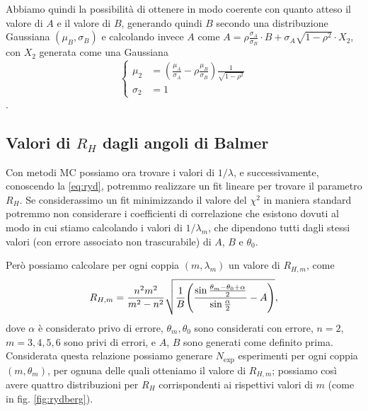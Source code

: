 \documentclass[a4paper,aps,12pt,tightenlines]{revtex4-2}
\begin{document}
Abbiamo quindi la possibilità di ottenere in modo coerente con quanto atteso il valore di $A$ e il valore di $B$, generando quindi $B$ secondo una distribuzione Gaussiana $(\mu_B, \sigma_B)$ e calcolando invece $A$ come $A=\rho \frac{\sigma_A}{\sigma_B}\cdot B + \sigma_A \sqrt{1-\rho^2} \cdot X_2$, con $X_2$ generata come una Gaussiana \begin{equation}\left\{\begin{aligned}\mu_2 &= \left(\frac{\mu_A}{\sigma_A} - \rho\frac{\mu_B}{\sigma_B}\right)\frac{1}{\sqrt{1-\rho^2}}\\\sigma_2 &= 1\end{aligned}\right.\end{equation}.

\subsection{Valori di $R_H$ dagli angoli di Balmer}\label{sec:R_H}

Con metodi MC possiamo ora trovare i valori di $1/\lambda$, e successivamente, conoscendo la \eqref{eq:ryd}, potremmo realizzare un fit lineare per trovare il parametro $R_H$. Se considerassimo un fit minimizzando il valore del $\chi^2$ in maniera standard potremmo non considerare i coefficienti di correlazione che esistono dovuti al modo in cui stiamo calcolando i valori di $1/\lambda_m$, che dipendono tutti dagli stessi valori (con errore associato non trascurabile) di $A$, $B$ e $\theta_0$. 

Però possiamo calcolare per ogni coppia $(m, \lambda_m)$ un valore di $R_{H,m}$, come \begin{equation} 
    R_{H,m} = \frac{n^2m^2}{m^2-n^2}\sqrt{\frac{1}{B} \qty(\frac{\sin\frac{\theta_m-\theta_0 + \alpha}{2}}{\sin\frac{\alpha}{2}}-A)},
\end{equation} dove $\alpha$ è considerato privo di errore, $\theta_m, \theta_0$ sono considerati con errore, $n=2$, $m=3,4,5,6$ sono privi di errori, e $A$, $B$ sono generati come definito prima. Considerata questa relazione possiamo generare $N_\text{exp}$ esperimenti per ogni coppia $(m, \theta_m)$, per ognuna delle quali otteniamo il valore di $R_{H,m}$; possiamo così avere quattro distribuzioni per $R_H$ corrispondenti ai rispettivi valori di $m$ (come in fig. \ref{fig:rydberg}). 
\end{document}
